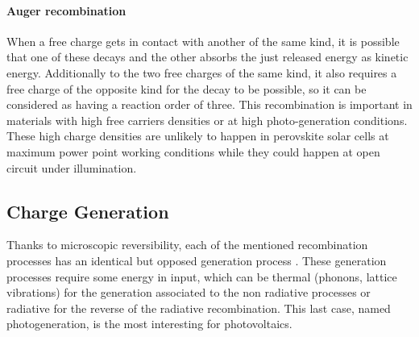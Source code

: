 		\paragraph{Auger recombination}
		When a free charge gets in contact with another of the same kind, it is possible that one of these decays and the other absorbs the just released energy as kinetic energy.
		Additionally to the two free charges of the same kind, it also requires a free charge of the opposite kind for the decay to be possible, so it can be considered as having a reaction order of three.
		This recombination is important in materials with high free carriers densities or at high photo-generation conditions.
		These high charge densities are unlikely to happen in perovskite solar cells at maximum power point working conditions while they could happen at open circuit under illumination.

	\subsection{Charge Generation}
	Thanks to microscopic reversibility, each of the mentioned recombination processes has an identical but opposed generation process \cite[81]{Nelson2003}.
	These generation processes require some energy in input, which can be thermal (phonons, lattice vibrations) for the generation associated to the non radiative processes or radiative for the reverse of the radiative recombination.
	This last case, named photogeneration, is the most interesting for photovoltaics.



